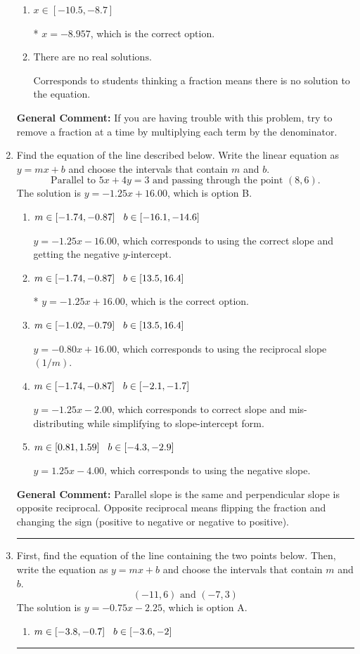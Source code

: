 \documentclass{extbook}[14pt]
\newcommand{\litem}[1]{\item #1

\rule{\textwidth}{0.4pt}}
\begin{document}
\begin{enumerate}
{\begin{enumerate}[label=\Alph*.]
 $x = -10.522$, which corresponds to not distributing the negative in front of the second fraction.
\item \( x \in [-10.5, -8.7] \)

* $x = -8.957$, which is the correct option.
\item \( \text{There are no real solutions.} \)

Corresponds to students thinking a fraction means there is no solution to the equation.
\end{enumerate}

\textbf{General Comment:} If you are having trouble with this problem, try to remove a fraction at a time by multiplying each term by the denominator.
}
\litem{
Find the equation of the line described below. Write the linear equation as $ y=mx+b $ and choose the intervals that contain $m$ and $b$.
\[ \text{Parallel to } 5 x + 4 y = 3 \text{ and passing through the point } (8, 6). \]The solution is \( y = -1.25x + 16.00 \), which is option B.\begin{enumerate}[label=\Alph*.]
\item \( m \in [-1.74, -0.87] \hspace*{3mm} b \in [-16.1, -14.6] \)

 $y = -1.25x - 16.00$, which corresponds to using the correct slope and getting the negative $y$-intercept.
\item \( m \in [-1.74, -0.87] \hspace*{3mm} b \in [13.5, 16.4] \)

* $y = -1.25x + 16.00$, which is the correct option.
\item \( m \in [-1.02, -0.79] \hspace*{3mm} b \in [13.5, 16.4] \)

 $y = -0.80x + 16.00$, which corresponds to using the reciprocal slope $(1/m)$.
\item \( m \in [-1.74, -0.87] \hspace*{3mm} b \in [-2.1, -1.7] \)

 $y = -1.25x - 2.00$, which corresponds to correct slope and mis-distributing while simplifying to slope-intercept form.
\item \( m \in [0.81, 1.59] \hspace*{3mm} b \in [-4.3, -2.9] \)

 $y = 1.25x - 4.00$, which corresponds to using the negative slope.
\end{enumerate}

\textbf{General Comment:} Parallel slope is the same and perpendicular slope is opposite reciprocal. Opposite reciprocal means flipping the fraction and changing the sign (positive to negative or negative to positive).
}
\litem{
First, find the equation of the line containing the two points below. Then, write the equation as $ y=mx+b $ and choose the intervals that contain $m$ and $b$.
\[ (-11, 6) \text{ and } (-7, 3) \]The solution is \( y = -0.75x -2.25 \), which is option A.\begin{enumerate}[label=\Alph*.]
\item \( m \in [-3.8, -0.7] \hspace*{3mm} b \in [-3.6, -2] \)


\end{enumerate}}
\end{enumerate}
\end{document}

